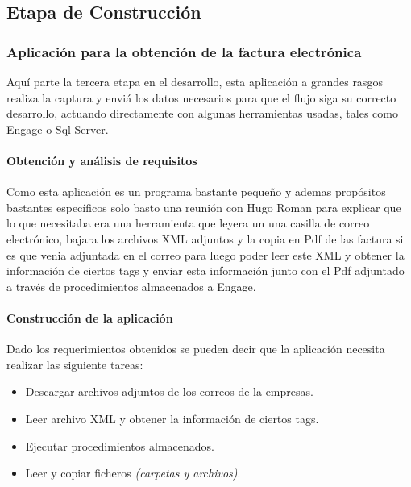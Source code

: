 \subsection{Etapa de Construcción}

\subsubsection{Aplicación para la obtención de la factura electrónica} 
Aquí parte la tercera etapa en el desarrollo, esta aplicación a grandes rasgos realiza la captura y enviá los datos necesarios para que el flujo siga su correcto desarrollo, actuando directamente con algunas herramientas usadas, tales como Engage o Sql Server. 
		
	\paragraph{Obtención y análisis de requisitos} 
	Como esta aplicación es un programa bastante pequeño y ademas propósitos bastantes específicos solo basto una reunión con Hugo Roman para explicar que lo que necesitaba era una herramienta que leyera un una casilla de correo electrónico, bajara los archivos XML adjuntos y la copia en Pdf de las factura si es que venia adjuntada en el correo para luego poder leer este XML y obtener la información de ciertos tags y enviar esta información junto con el Pdf adjuntado a través de procedimientos almacenados a Engage.

	\paragraph{Construcción de la aplicación}
			Dado los requerimientos obtenidos se pueden decir que la aplicación necesita realizar las siguiente tareas:
			
			\begin{itemize}
				\item Descargar archivos adjuntos de los correos de la empresas.
				\item Leer archivo XML y obtener la información de ciertos tags.
				\item Ejecutar procedimientos almacenados.
				\item Leer y copiar ficheros \textit{(carpetas y archivos)}.
			\end{itemize}
			
